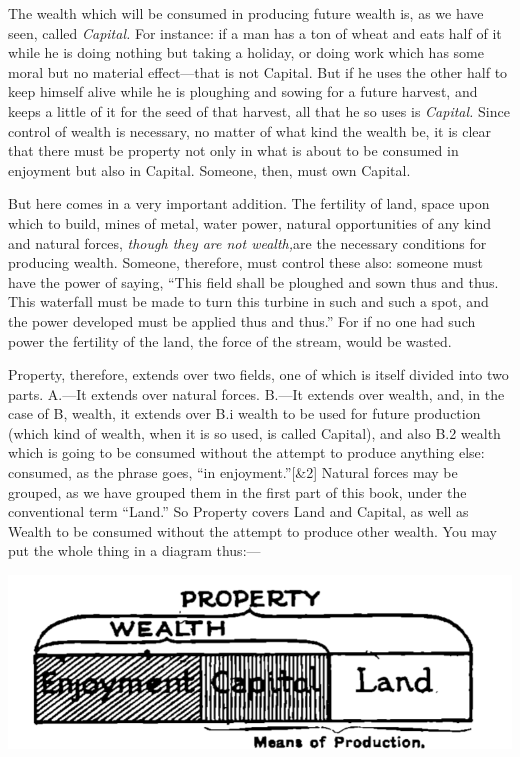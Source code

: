 \documentclass{book}
\begin{document}
The wealth which will be consumed in producing future wealth is, as we have seen, called \emph{Capital.} For instance: if a man has a ton of wheat and eats half of it while he is doing nothing but taking a holiday, or doing work which has some moral but no material effect—that is not Capital. But if he uses the other half to keep himself alive while he is ploughing and sowing for a future harvest, and keeps a little of it for the seed of that harvest, all that he so uses is \emph{Capital.} Since control of wealth is necessary, no matter of what kind the wealth be, it is clear that there must be property not only in what is about to be consumed in enjoyment but also in Capital. Someone, then, must own Capital.

But here comes in a very important addition. The fertility of land, space upon which to build, mines of metal, water power, natural opportunities of any kind and natural forces, \emph{though they are not wealth,}\footnotemark[1] are the necessary conditions for producing wealth. Someone, therefore, must control these also: someone must have the power of saying, “This field shall be ploughed and sown thus and thus. This waterfall must be made to turn this turbine in such and such a spot, and the power developed must be applied thus and thus.” For if no one had such power the fertility of the land, the force of the stream, would be wasted.

Property, therefore, extends over two fields, one of which is itself divided into two parts. A.—It extends over natural forces. B.—It extends over wealth, and, in the case of B, wealth, it extends over B.i wealth to be used for future production (which kind of wealth, when it is so used, is called Capital), and also B.2 wealth which is going to be consumed without the attempt to produce anything else: consumed, as the phrase goes, “in enjoyment.”{[}\&2{]} Natural forces may be grouped, as we have grouped them in the first part of this book, under the conventional term “Land.” So Property covers Land and Capital, as well as Wealth to be consumed without the attempt to produce other wealth. You may put the whole thing in a diagram thus:—

\begin{center}
	\includegraphics[width=0.8\linewidth]{assets/Property.png}
\end{center}
\end{document}

